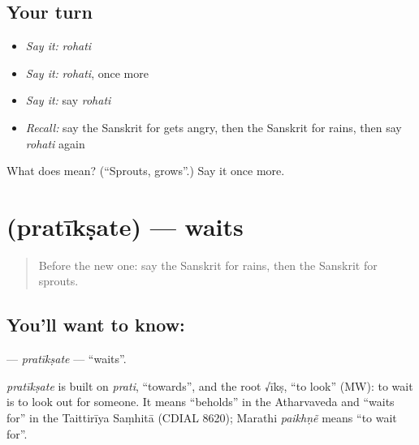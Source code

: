 \subsection*{Your turn}
\begin{itemize}
\raggedright
  \item \emph{Say it:} \emph{rohati}
  \item \emph{Say it:} \emph{rohati}, once more
  \item \emph{Say it:} say \emph{rohati}
  \item \emph{Recall:} say the Sanskrit for gets angry, then the Sanskrit for rains, then say \emph{rohati} again
\end{itemize}

\begin{tcolorbox}[breakable,colback=teal!4,colframe=teal!35!black,title={Before you move on}]
What does  mean? (\textquotedblleft{}Sprouts, grows\textquotedblright{}.) Say it once more.
\end{tcolorbox}
\section[\texorpdfstring{\sk{प्रतीक्षते} (pratīkṣate)}{प्रतीक्षते (pratīkṣate)}]{ (pratīkṣate) — waits}

\label{lesson:SA-C233-pratiksate}



\begin{quote}
Before the new one: say the Sanskrit for rains, then the Sanskrit for sprouts.
\end{quote}

\subsection*{You'll want to know: }
\textbf{} — \emph{pratīkṣate} — \textquotedblleft{}waits\textquotedblright{}.

\begin{cousinweb}
\emph{pratīkṣate} is built on \emph{prati}, \textquotedblleft{}towards\textquotedblright{}, and the root √īkṣ, \textquotedblleft{}to look\textquotedblright{} (MW): to wait is to look out for someone. It means \textquotedblleft{}beholds\textquotedblright{} in the Atharvaveda and \textquotedblleft{}waits for\textquotedblright{} in the Taittirīya Saṃhitā (CDIAL 8620); Marathi \emph{paikhṇẽ} means \textquotedblleft{}to wait for\textquotedblright{}.
\end{cousinweb}

